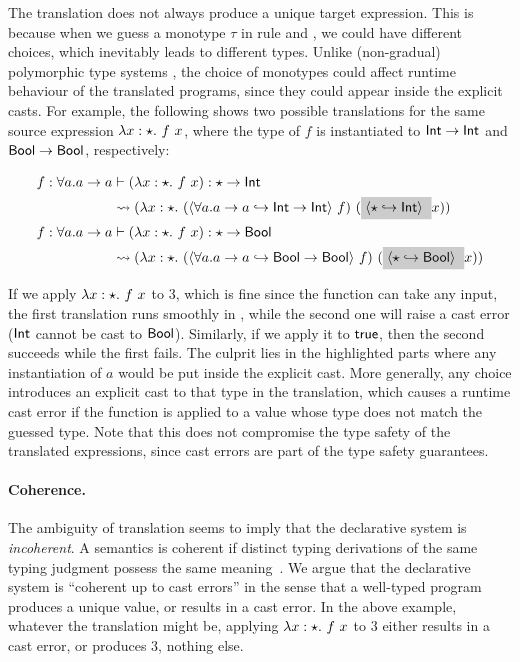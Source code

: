 The translation does not always produce a unique target expression.
This is because when we guess a monotype $\tau$ in rule  and
, we could have different choices, which inevitably leads to
different types. Unlike (non-gradual) polymorphic type systems
\citep{jones2007practical, dunfield2013complete}, the choice of monotypes could affect
runtime behaviour of the translated programs, since they could appear inside the
explicit casts. For example, the following shows two possible translations for
the same source expression $\lambda x:\star.~ {f ~ x}$, where the type of $f$ is
instantiated to $\mathsf{Int} \to \mathsf{Int}$ and $\mathsf{Bool} \to \mathsf{Bool}$, respectively:
\begin{small}
\begin{align*}
  f: \forall a. a \to a &\byinf (\blam x \unknown {f ~ x})
                          : \unknown \to \nat \\
                          &\trto (\blam x \unknown (\cast {\forall a. a \to a} {\nat \to \nat} f) ~
                          (\hlmath{\cast \unknown \nat} x))
  \\
  f: \forall a. a \to a &\byinf (\blam x \unknown {f ~ x})
                          : \unknown \to \bool \\
                          &\trto (\blam x \unknown (\cast {\forall a. a \to a} {\bool \to \bool} f) ~
                          (\hlmath{\cast \unknown \bool} x))
\end{align*}
\end{small}
If we apply $\lambda x:\star.~ {f ~ x}$ to $3$, which is fine
since the function can take any input, the first translation runs smoothly in
\pbc, while the second one will raise a cast error ($\mathsf{Int}$ cannot be cast to
$\mathsf{Bool}$). Similarly, if we apply it to $\mathsf{true}$, then the second succeeds while
the first fails. The culprit lies in the highlighted parts where any
instantiation of $a$ would be put inside the explicit cast. More generally, any
choice introduces an explicit cast to that type in the translation, which causes
a runtime cast error if the function is applied to a value whose type does not
match the guessed type. Note that this does not compromise the type safety of
the translated expressions, since cast errors are part of the type safety
guarantees.

\paragraph{Coherence.}

The ambiguity of translation seems to imply that the declarative system is
\textit{incoherent}. A semantics
is coherent if distinct typing derivations of the same typing judgment possess
the same meaning~\citep{Reynolds_coherence}. We argue that the declarative
system is ``coherent up to cast errors'' in the sense that a well-typed program
produces a unique value, or results in a cast error. In the above example,
whatever the translation might be, applying $\lambda x:\star.~ {f ~ x}$ to $3$
either results in a cast error, or produces $3$, nothing else.

